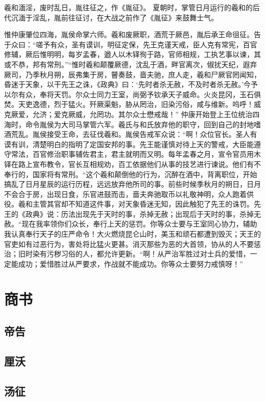 \documentclass[12pt,UTF8]{ctexbook}
\begin{document}
羲和湎淫，废时乱日，胤往征之，作《胤征》。
夏朝时，掌管日月运行的羲和的后代沉湎于淫乱，胤前往征讨，在大战之前作了《胤征》来鼓舞士气。

惟仲康肇位四海，胤侯命掌六师。羲和废厥职，酒荒于厥邑，胤后承王命徂征。告于众曰：“嗟予有众，圣有谟训，明征定保，先王克谨天戒，臣人克有常宪，百官修辅，厥后惟明明，每岁孟春，遒人以木铎徇于路，官师相规，工执艺事以谏，其或不恭，邦有常刑。”“惟时羲和颠覆厥德，沈乱于酒，畔官离次，俶扰天纪，遐弃厥司，乃季秋月朔，辰弗集于房，瞽奏鼓，啬夫驰，庶人走，羲和尸厥官罔闻知，昏迷于天象，以干先王之诛，《政典》曰：‘先时者杀无赦，不及时者杀无赦。’今予以尔有众，奉将天罚。尔众士同力王室，尚弼予钦承天子威命。火炎昆冈，玉石俱焚。天吏逸德，烈于猛火。歼厥渠魁，胁从罔治，旧染污俗，咸与维新。呜呼！威克厥爱，允济；爱克厥威，允罔功。其尔众士懋戒哉！”
仲康开始登上王位统治四海时，命令胤侯为大司马掌管六军。羲氏与和氏放弃他的职守，回到自己的封地嗜酒荒乱。胤侯接受王命，去征伐羲和。胤侯告戒军众说：“啊！众位官长。圣人有谟有训，清楚明白的指明了定国安邦的事。先王能谨慎对待上天的警戒，大臣能遵守常法，百官修治职事辅佐君主，君主就明而又明。每年孟春之月，宣令官员用木铎在路上宣布教令，官长互相规劝，百工依据他们从事的技艺进行谏说。他们有不奉行的，国家将有常刑。“这个羲和颠倒他的行为，沉醉在酒中，背离职位，开始搞乱了日月星辰的运行历程，远远放弃他所司的事。前些时候季秋月的朔日，日月不会合于房，出现日食，乐官进鼓而击，啬夫奔驰取币以礼敬神明，众人跑着供役。羲和主管其官却不知道这件事，对天象昏迷无知，因此触犯了先王的诛罚。先王的《政典》说：历法出现先于天时的事，杀掉无赦；出现后于天时的事，杀掉无赦。“现在我率领你们众长，奉行上天的惩罚。你等众士要与王室同心协力，辅助我认真奉行天子的庄严命令！大火燃烧昆仑山时，美玉和顽石都遭到毁灭；天王的官吏如有过恶行为，害处将比猛火更甚。消灭那些为恶的大首领，协从的人不要惩治；旧时染有污秽习俗的人，都允许更新。“啊！从严治军胜过对士兵的爱惜，一定能成功；爱惜胜过从严要求，作战就不能成功。你等众士要努力戒慎呀！”

\part{商书}

\chapter{帝告}

\chapter{厘沃}
\chapter{汤征}
\end{document}
